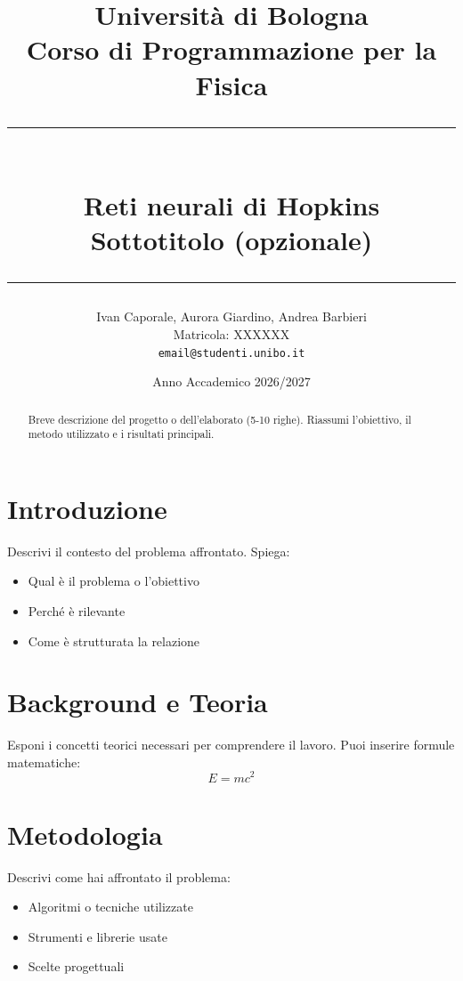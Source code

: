 \documentclass[12pt, a4paper]{article}
\title{
    \vspace{2cm}
    {\Large Università di Bologna} \\
    \vspace{0.5cm}
    {\large Corso di Programmazione per la Fisica} \\
    \vspace{2cm}
    \rule{\linewidth}{0.5pt} \\
    \vspace{0.5cm}
    {\LARGE \textbf{Reti neurali di Hopkins}} \\
    \vspace{0.3cm}
    {\large Sottotitolo (opzionale)} \\
    \vspace{0.5cm}
    \rule{\linewidth}{0.5pt}
}
\author{
    Ivan Caporale, Aurora Giardino, Andrea Barbieri \\
    \small Matricola: XXXXXX \\
    \small \texttt{email@studenti.unibo.it}
}
\date{Anno Accademico 2026/2027}
\begin{document}
\maketitle
\thispagestyle{empty}
\newpage

\tableofcontents
\newpage

\begin{abstract}
    Breve descrizione del progetto o dell'elaborato (5-10 righe).
    Riassumi l'obiettivo, il metodo utilizzato e i risultati principali.
\end{abstract}

\newpage

\section{Introduzione}
Descrivi il contesto del problema affrontato. Spiega:
\begin{itemize}
    \item Qual è il problema o l'obiettivo
    \item Perché è rilevante
    \item Come è strutturata la relazione
\end{itemize}

\section{Background e Teoria}
Esponi i concetti teorici necessari per comprendere il lavoro.
Puoi inserire formule matematiche:
\begin{equation}
    E = mc^2
\end{equation}

\section{Metodologia}
Descrivi come hai affrontato il problema:
\begin{itemize}
    \item Algoritmi o tecniche utilizzate
    \item Strumenti e librerie usate
    \item Scelte progettuali
\end{itemize}
\end{document}
